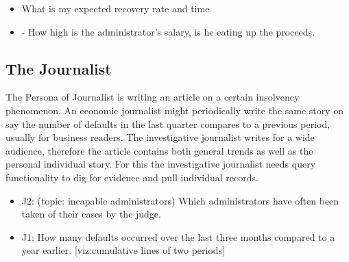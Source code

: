 \begin{itemize}
	\item What is my expected recovery rate and time
	\item -	How high is the administrator’s salary, is he eating up the proceeds.
\end{itemize}

\subsection{The Journalist}
The Persona of Journalist is writing an article on a certain insolvency phenomenon. An economic journalist might periodically write the same story on say the number of defaults in the last quarter compares to a previous period, usually for business readers. The investigative journalist writes for a wide audience, therefore the article contains both general trends as well as the personal individual story. For this the investigative journalist needs query functionality to dig for evidence and pull individual records.

\begin{itemize}
	\item J2: (topic: incapable administrators) Which administrators have often been taken of their cases by the judge.
	\item J1: How many defaults occurred over the last three months compared to a year earlier. [viz:cumulative lines of two periods]
\end{itemize}
